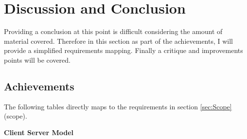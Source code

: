 \chapter{Discussion and Conclusion}

	\normalsize
	{
		Providing a conclusion at this point is difficult considering the amount of material covered.
		Therefore in this section as part of the achievements, I will provide a simplified requirements mapping.
		Finally a critique and improvements points will be covered.
	}

	\section{Achievements}
	
	\normalsize
	{
		The following tables directly maps to the requirements in section \ref{sec:Scope} (scope).
	}
	
	\vspace{5mm}
	\large{\bfseries{Client Server Model}}
	\vspace{4mm}
	
